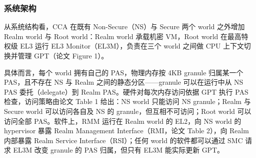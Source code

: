 \documentclass[11pt]{ctexart}
\begin{document}
\subsubsection{系统架构}
从系统结构看，CCA 在既有 Non-Secure（NS）与 Secure 两个 world 之外增加 Realm world 与 Root world：Realm world 承载机密 VM，Root world 在最高特权级 EL3 运行 EL3 Monitor（EL3M），负责在三个 world 之间做 CPU 上下文切换并管理 GPT（论文 Figure 1）。\par
具体而言，每个 world 拥有自己的 PAS，物理内存按 4KB granule 归属某一个 PAS，且不存在 NS 与 Realm 之间的静态分区——granule 可以在运行中从 NS PAS 委托（delegate）到 Realm PAS。硬件对每次内存访问依据 GPT 执行 PAS 检查，访问策略由论文 Table 1 给出：NS world 只能访问 NS granule；Realm 与 Secure world 可以访问各自及 NS 的 granule，但互相不可访问；Root world 可以访问全部 PAS。软件上，RMM 运行在 Realm world 的 EL2，向 NS world 的 hypervisor 暴露 Realm Management Interface（RMI，论文 Table 2），向 Realm 内部暴露 Realm Service Interface（RSI）；任何 world 的软件都可以通过 SMC 请求 EL3M 改变 granule 的 PAS 归属，但只有 EL3M 能实际更新 GPT。\par
\end{document}
